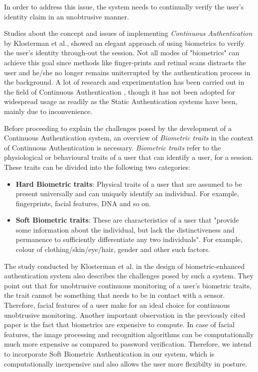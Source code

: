\documentclass[12pt]{article}			%
\begin{document}
In order to address this issue, the system needs to continually verify the user's identity claim in an unobtrusive manner.

Studies about the concept and issues of implementing \emph{Continuous Authentication} by Klosterman et al.\cite{Klos00}, showed an elegant approach of using biometrics to verify the user's identity through-out the session. Not all modes of "biometrics" can achieve this goal since methods like finger-prints and retinal scans distracts the user and he/she no longer remains uniterrupted by the authentication process in the background.
A lot of research and experimentation has been carried out in the field of Continuous Authentication \cite{Niin10,Klos00,mon00,turk03,sim07,azz08,azz082}, though it has not been adopted for widespread usage as readily as the Static Authentication systems have been, mainly due to inconvenience.

Before proceeding to explain the challenges posed by the development of a Continuous Authentication system, an overview of \emph{Biometric traits} in the context of Continuous Authentication is necessary.
\emph{Biometric traits} refer to the physiological or behavioural traits of a user that can identify a user, for a session.
These traits can be divided into the following two categories:
\begin{itemize}
	\item {\bf Hard Biometric traits}: Physical traits of a user that are assumed to be present universally and can uniquely identify an individual. For example, fingerprints, facial features, DNA and so on.
	\item {\bf Soft Biometric traits}: These are characteristics of a user that "provide some information about the individual, but lack the distinctiveness and permanence to sufficiently differentiate any two individuals"\cite{Jain204}. For example, colour of clothing/skin/eye/hair, gender and other such factors.
\end{itemize}

The study conducted by Klosterman et al.\cite{Klos00} in the design of biometric-enhanced authentication system also describes the challenges posed by such a system.
They point out that for unobtrusive continuous monitoring of a user's biometric traits, the trait cannot be something that needs to be in contact with a sensor.
Therefore, facial features of a user make for an ideal choice for continuous unobtrusive monitoring.
Another important observation in the previously cited paper is the fact that biometrics are expensive to compute.
In case of facial features, the image processing and recognition algorithms can be computationally much more expensive as compared to password verification.
Therefore, we intend to incorporate Soft Biometric Authentication in our system, which is computationally inexpensive and also allows the user more flexibilty in posture. 
\end{document}
